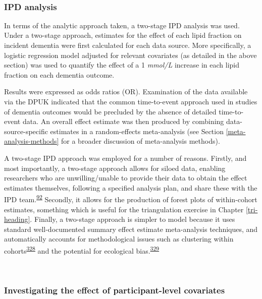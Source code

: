 \documentclass[a4paper, twoside]{templates/ociamthesis}
\begin{document}
~

\hypertarget{ipd-analysis}{%
\subsubsection{IPD analysis}\label{ipd-analysis}}

In terms of the analytic approach taken, a two-stage IPD analysis was used. Under a two-stage approach, estimates for the effect of each lipid fraction on incident dementia were first calculated for each data source. More specifically, a logistic regression model adjusted for relevant covariates (as detailed in the above section) was used to quantify the effect of a 1 \emph{mmol/L} increase in each lipid fraction on each dementia outcome.

Results were expressed as odds ratios (OR). Examination of the data available via the DPUK indicated that the common time-to-event approach used in studies of dementia outcomes would be precluded by the absence of detailed time-to-event data. An overall effect estimate was then produced by combining data-source-specific estimates in a random-effects meta-analysis (see Section \ref{meta-analysis-methods} for a broader discussion of meta-analysis methods).

A two-stage IPD approach was employed for a number of reasons. Firstly, and most importantly, a two-stage approach allows for siloed data, enabling researchers who are unwilling/unable to provide their data to obtain the effect estimates themselves, following a specified analysis plan, and share these with the IPD team.\textsuperscript{\protect\hyperlink{ref-riley2010}{92}} Secondly, it allows for the production of forest plots of within-cohort estimates, something which is useful for the triangulation exercise in Chapter \ref{tri-heading}. Finally, a two-stage approach is simpler to model because it uses standard well-documented summary effect estimate meta-analysis techniques, and automatically accounts for methodological issues such as clustering within cohorts\textsuperscript{\protect\hyperlink{ref-abo-zaid2013}{328}} and the potential for ecological bias.\textsuperscript{\protect\hyperlink{ref-burke2017}{329}}

~

\hypertarget{investigating-the-effect-of-participant-level-covariates}{%
\subsubsection{Investigating the effect of participant-level covariates}\label{investigating-the-effect-of-participant-level-covariates}}
\end{document}

